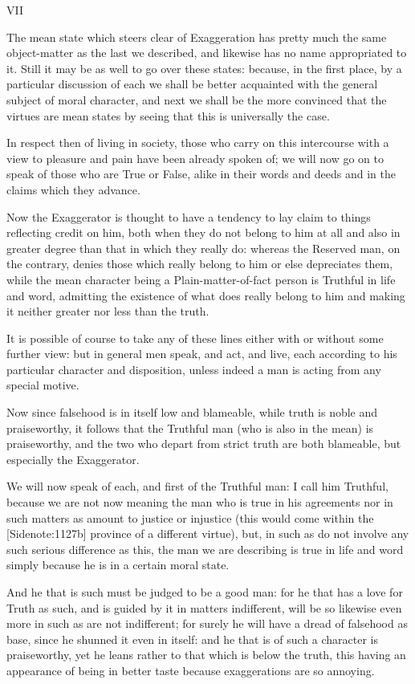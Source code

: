 VII

The mean state which steers clear of Exaggeration has pretty much the
same object-matter as the last we described, and likewise has no name
appropriated to it. Still it may be as well to go over these states:
because, in the first place, by a particular discussion of each we shall
be better acquainted with the general subject of moral character, and
next we shall be the more convinced that the virtues are mean states by
seeing that this is universally the case.

In respect then of living in society, those who carry on this
intercourse with a view to pleasure and pain have been already spoken
of; we will now go on to speak of those who are True or False, alike in
their words and deeds and in the claims which they advance.

Now the Exaggerator is thought to have a tendency to lay claim to things
reflecting credit on him, both when they do not belong to him at all and
also in greater degree than that in which they really do: whereas the
Reserved man, on the contrary, denies those which really belong to
him or else depreciates them, while the mean character being a
Plain-matter-of-fact person is Truthful in life and word, admitting
the existence of what does really belong to him and making it neither
greater nor less than the truth.

It is possible of course to take any of these lines either with or
without some further view: but in general men speak, and act, and live,
each according to his particular character and disposition, unless
indeed a man is acting from any special motive.

Now since falsehood is in itself low and blameable, while truth is noble
and praiseworthy, it follows that the Truthful man (who is also in the
mean) is praiseworthy, and the two who depart from strict truth are both
blameable, but especially the Exaggerator.

We will now speak of each, and first of the Truthful man: I call him
Truthful, because we are not now meaning the man who is true in his
agreements nor in such matters as amount to justice or injustice (this
would come within the [Sidenote:1127b] province of a different virtue),
but, in such as do not involve any such serious difference as this, the
man we are describing is true in life and word simply because he is in a
certain moral state.

And he that is such must be judged to be a good man: for he that has a
love for Truth as such, and is guided by it in matters indifferent, will
be so likewise even more in such as are not indifferent; for surely he
will have a dread of falsehood as base, since he shunned it even in
itself: and he that is of such a character is praiseworthy, yet he leans
rather to that which is below the truth, this having an appearance of
being in better taste because exaggerations are so annoying.

